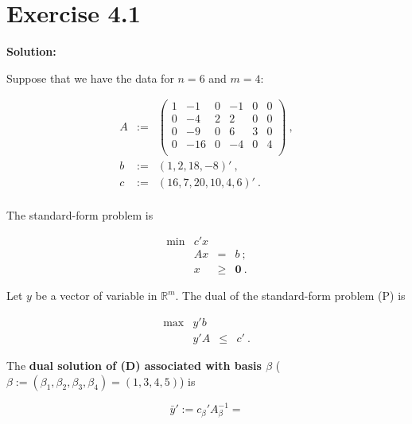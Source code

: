 
\section{Exercise 4.1}

\textbf{Solution:}

Suppose that we have the data for $n=6$ and $m=4$:

\[
\begin{array}{ccl}
A & := & \left(
  \begin{array}{cccccc}
    1 & -1 & 0 & -1 & 0 & 0 \\
    0 & -4 & 2 & 2 & 0 & 0 \\
    0 & -9 & 0 & 6 & 3 & 0 \\
    0 & -16 & 0 & -4 & 0 & 4 \\
  \end{array}
\right)~, \\
b & := & (1,2,18,-8)'~,\\
c & := & (16, 7, 20, 10, 4, 6)'~.\\

\end{array}
\]

The standard-form problem is 

\[
\tag{P}
\begin{array}{rrcl}
 \min & c'x  &      &   \\
      &  Ax  &   =  & b~; \\
      &   x  & \geq & \mathbf{0}~.
\end{array}
\]

Let $y$ be a vector of variable in $\mathbb{R}^m$. The dual of the standard-form problem (P) is

\[
\begin{array}{rrcl}
 \max & y'b  &      &   \\
      &  y'A  &   \leq  & c'~.
\end{array}
\tag{D}
\]

The \textbf{ dual solution of (D) associated with basis $\beta$} ($\beta := (\beta_1, \beta_2, \beta_3, \beta_4) = (1,3,4,5)$) is

$$\bar{y}':= c_\beta'A_\beta^{-1} = $$


